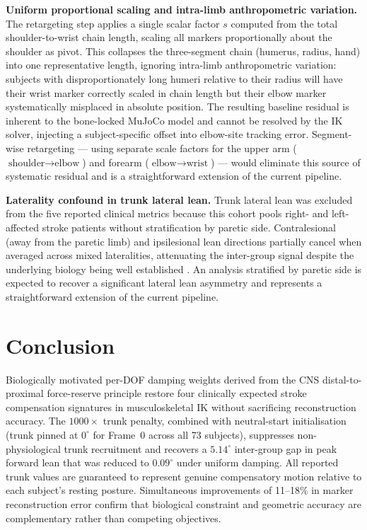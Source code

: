 \documentclass[journal,10pt,twocolumn]{IEEEtran}
\begin{document}
\textbf{Uniform proportional scaling and intra-limb anthropometric variation.}
The retargeting step applies a single scalar factor $s$ computed from the
total shoulder-to-wrist chain length, scaling all markers proportionally
about the shoulder as pivot.
This collapses the three-segment chain (humerus, radius, hand) into one
representative length, ignoring intra-limb anthropometric variation:
subjects with disproportionately long humeri relative to their radius will
have their wrist marker correctly scaled in chain length but their elbow
marker systematically misplaced in absolute position.
The resulting baseline residual is inherent to the bone-locked MuJoCo model
and cannot be resolved by the IK solver, injecting a subject-specific
offset into elbow-site tracking error.
Segment-wise retargeting --- using separate scale factors for the upper arm
($\text{shoulder}{\to}\text{elbow}$) and forearm
($\text{elbow}{\to}\text{wrist}$) --- would eliminate this source of
systematic residual and is a straightforward extension of the current pipeline.

\textbf{Laterality confound in trunk lateral lean.}
Trunk lateral lean was excluded from the five reported clinical metrics
because this cohort pools right- and left-affected stroke patients
without stratification by paretic side.
Contralesional (away from the paretic limb) and ipsilesional lean
directions partially cancel when averaged across mixed lateralities,
attenuating the inter-group signal despite the underlying biology being
well established \cite{cirstea2000}.
An analysis stratified by paretic side is expected to recover a
significant lateral lean asymmetry and represents a straightforward
extension of the current pipeline.

\section{Conclusion}

Biologically motivated per-DOF damping weights derived from the CNS
distal-to-proximal force-reserve principle restore four clinically expected
stroke compensation signatures in musculoskeletal IK without sacrificing
reconstruction accuracy. The $1000\times$ trunk penalty, combined with
neutral-start initialisation (trunk pinned at $0^{\circ}$ for Frame~0
across all 73 subjects), suppresses non-physiological trunk recruitment and recovers
a $5.14^{\circ}$ inter-group gap in peak forward lean that was reduced to
$0.09^{\circ}$ under uniform damping. All reported trunk values are
guaranteed to represent genuine compensatory motion relative to each
subject's resting posture. Simultaneous improvements of 11--18\% in
marker reconstruction error confirm that biological constraint and
geometric accuracy are complementary rather than competing objectives.
\end{document}
